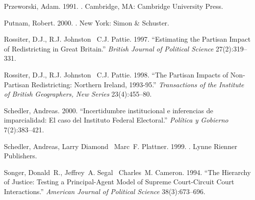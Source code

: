 \documentclass[12 pt, letter]{article}
\begin{document}
\begin{thebibliography}{77}
Przeworski, Adam. 1991.
.
\newblock Cambridge, MA:  Cambridge University Press.

Putnam, Robert. 2000.
.
\newblock New York:  Simon \& Schuster.

Rossiter, D.J., R.J. Johnston \harvardand\ C.J. Pattie. 1997.
\newblock ``Estimating the Partisan Impact of Redistricting in {G}reat
  {B}ritain.'' {\em British Journal of Political Science} 27(2):319--331.

Rossiter, D.J., R.J. Johnston \harvardand\ C.J. Pattie. 1998.
\newblock ``The Partisan Impacts of Non-Partisan Redistricting: Northern
  Ireland, 1993-95.'' {\em Transactions of the Institute of British
  Geographers, New Series} 23(4):455--80.

Schedler, Andreas. 2000.
\newblock ``Incertidumbre institucional e inferencias de imparcialidad: {E}l
  caso del {I}nstituto {F}ederal {E}lectoral.'' {\em Pol\'{i}tica y Gobierno}
  7(2):383--421.

Schedler, Andreas, Larry Diamond \harvardand\ Marc~F. Plattner. 1999.
.
\newblock Lynne Rienner Publishers.

Songer, Donald~R., Jeffrey~A. Segal \harvardand\ Charles~M. Cameron. 1994.
\newblock ``The Hierarchy of Justice: Testing a Principal-Agent Model of
  Supreme Court-Circuit Court Interactions.'' {\em American Journal of
  Political Science} 38(3):673--696.

\end{thebibliography}
\end{document}
